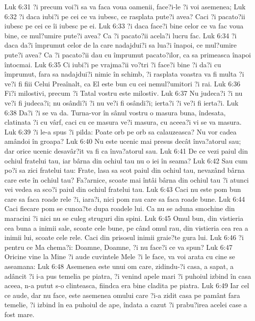 Luk 6:31  ?i precum voi?i sa va faca voua oamenii, face?i-le ?i voi asemenea;
Luk 6:32  ?i daca iubi?i pe cei ce va iubesc, ce rasplata pute?i avea? Caci ?i pacato?ii iubesc pe cei ce îi iubesc pe ei.
Luk 6:33  ?i daca face?i bine celor ce va fac voua bine, ce mul?umire pute?i avea? Ca ?i pacato?ii acela?i lucru fac.
Luk 6:34  ?i daca da?i împrumut celor de la care nadajdui?i sa lua?i înapoi, ce mul?umire pute?i avea? Ca ?i pacato?ii dau cu împrumut pacato?ilor, ca sa primeasca înapoi întocmai.
Luk 6:35  Ci iubi?i pe vrajma?ii vo?tri ?i face?i bine ?i da?i cu împrumut, fara sa nadajdui?i nimic în schimb, ?i rasplata voastra va fi multa ?i ve?i fi fiii Celui Preaînalt, ca El este bun cu cei nemul?umitori ?i rai.
Luk 6:36  Fi?i milostivi, precum ?i Tatal vostru este milostiv.
Luk 6:37  Nu judeca?i ?i nu ve?i fi judeca?i; nu osândi?i ?i nu ve?i fi osândi?i; ierta?i ?i ve?i fi ierta?i.
Luk 6:38  Da?i ?i se va da. Turna-vor în sânul vostru o masura buna, îndesata, clatinata ?i cu vârf, caci cu ce masura ve?i masura, cu aceea?i vi se va masura.
Luk 6:39  ?i le-a spus ?i pilda: Poate orb pe orb sa calauzeasca? Nu vor cadea amândoi în groapa?
Luk 6:40  Nu este ucenic mai presus decât înva?atorul sau; dar orice ucenic desavâr?it va fi ca înva?atorul sau.
Luk 6:41  De ce vezi paiul din ochiul fratelui tau, iar bârna din ochiul tau nu o iei în seama?
Luk 6:42  Sau cum po?i sa zici fratelui tau: Frate, lasa sa scot paiul din ochiul tau, nevazând bârna care este în ochiul tau? Fa?arnice, scoate mai întâi bârna din ochiul tau ?i atunci vei vedea sa sco?i paiul din ochiul fratelui tau.
Luk 6:43  Caci nu este pom bun care sa faca roade rele ?i, iara?i, nici pom rau care sa faca roade bune.
Luk 6:44  Caci fiecare pom se cunoa?te dupa roadele lui. Ca nu se aduna smochine din maracini ?i nici nu se culeg struguri din spini.
Luk 6:45  Omul bun, din vistieria cea buna a inimii sale, scoate cele bune, pe când omul rau, din vistieria cea rea a inimii lui, scoate cele rele. Caci din prisosul inimii graie?te gura lui.
Luk 6:46  ?i pentru ce Ma chema?i: Doamne, Doamne, ?i nu face?i ce va spun?
Luk 6:47  Oricine vine la Mine ?i aude cuvintele Mele ?i le face, va voi arata cu cine se aseamana:
Luk 6:48  Asemenea este unui om care, zidindu-?i casa, a sapat, a adâncit ?i i-a pus temelia pe piatra, ?i venind apele mari ?i puhoiul izbind în casa aceea, n-a putut s-o clinteasca, fiindca era bine cladita pe piatra.
Luk 6:49  Iar cel ce aude, dar nu face, este asemenea omului care ?i-a zidit casa pe pamânt fara temelie, ?i izbind în ea puhoiul de ape, îndata a cazut ?i prabu?irea acelei case a fost mare.
